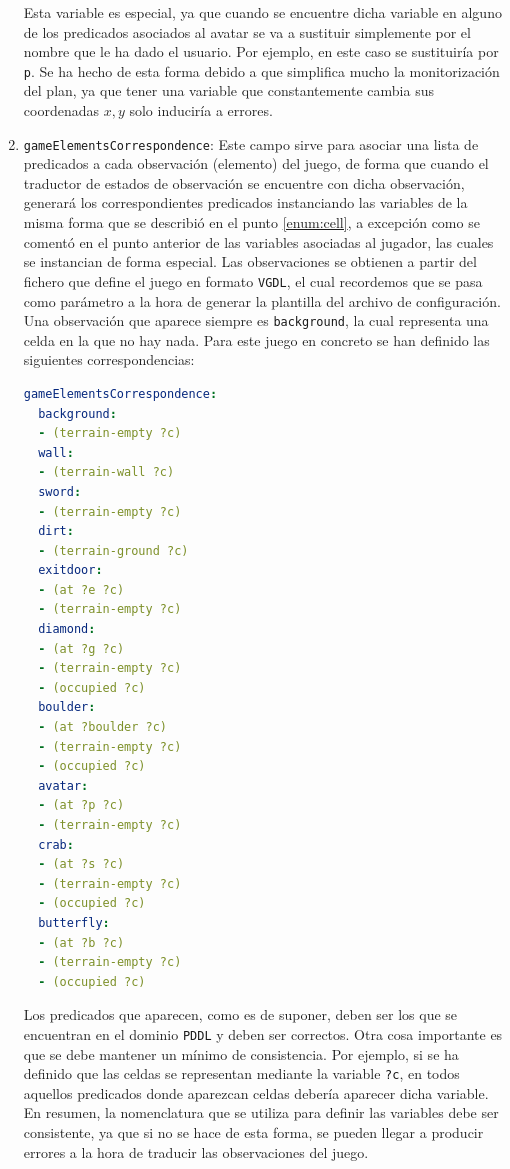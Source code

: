 \begin{enumerate}
    Esta variable es especial, ya que cuando se encuentre dicha variable en alguno de los predicados asociados
    al avatar se va a sustituir simplemente por el nombre que le ha dado el usuario. Por ejemplo,
    en este caso se sustituiría por \texttt{p}. Se ha hecho de esta forma debido a que simplifica
    mucho la monitorización del plan, ya que tener una variable que constantemente cambia sus coordenadas
    $x,y$ solo induciría a errores.
    
    \item \texttt{gameElementsCorrespondence}: Este campo sirve para asociar una lista de predicados
    a cada observación (elemento) del juego, de forma que cuando el traductor de estados de observación
    se encuentre con dicha observación, generará los correspondientes predicados instanciando las variables
    de la misma forma que se describió en el punto \ref{enum:cell}, a excepción como se comentó en el
    punto anterior de las variables asociadas al jugador, las cuales se instancian de forma especial.
    Las observaciones se obtienen a partir del fichero que define el juego en formato \texttt{VGDL}, el
    cual recordemos que se pasa como parámetro a la hora de generar la plantilla del archivo de configuración.
    Una observación que aparece siempre es \texttt{background}, la cual representa una celda en la que no
    hay nada. Para este juego en concreto se han definido las siguientes correspondencias:
    
    \begin{lstlisting}[language=yaml]
gameElementsCorrespondence:
  background:
  - (terrain-empty ?c)
  wall:
  - (terrain-wall ?c)
  sword:
  - (terrain-empty ?c)
  dirt:
  - (terrain-ground ?c)
  exitdoor:
  - (at ?e ?c)
  - (terrain-empty ?c)
  diamond:
  - (at ?g ?c)
  - (terrain-empty ?c)
  - (occupied ?c)
  boulder:
  - (at ?boulder ?c)
  - (terrain-empty ?c)
  - (occupied ?c)
  avatar:
  - (at ?p ?c)
  - (terrain-empty ?c)
  crab:
  - (at ?s ?c)
  - (terrain-empty ?c)
  - (occupied ?c)
  butterfly:
  - (at ?b ?c)
  - (terrain-empty ?c)
  - (occupied ?c)    
    \end{lstlisting}
    
    Los predicados que aparecen, como es de suponer, deben ser los que se encuentran en el dominio
    \texttt{PDDL} y deben ser correctos. Otra cosa importante es que se debe mantener un mínimo de consistencia.
    Por ejemplo, si se ha definido que las celdas se representan mediante la variable \texttt{?c}, en
    todos aquellos predicados donde aparezcan celdas debería aparecer dicha variable. En resumen, la nomenclatura
    que se utiliza para definir las variables debe ser consistente, ya que si no se hace de esta forma,
    se pueden llegar a producir errores a la hora de traducir las observaciones del juego.
    

\end{enumerate}
